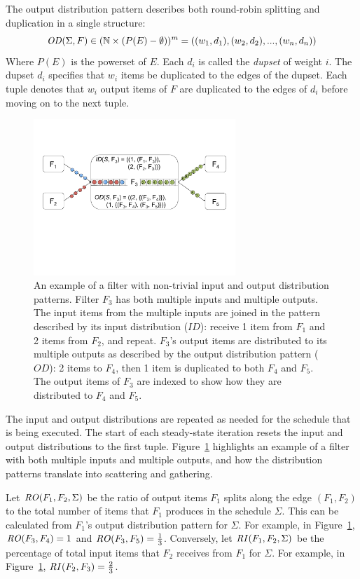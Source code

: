 The output distribution pattern describes both round-robin
splitting and duplication in a single structure:
{\ninepoint
\[ \relax{\it OD}(\Sigma, F) \in (\mathbb{N} \times (P(E)-\emptyset))^m = ((w_1,d_1), (w_2,
d_2), ..., (w_n, d_n))\]
}
\noindent Where $P(E)$ is the powerset of $E$.  Each $d_i$ is called
the {\it dupset} of weight $i$.  The dupset $d_i$ specifies that $w_i$
items be duplicated to the edges of the dupset.  Each tuple denotes
that $w_i$ output items of $F$ are duplicated to the edges of $d_i$
before moving on to the next tuple.

\begin{figure}[t]
\centering
\includegraphics[width=3in]{figures/dist-example.pdf}
\caption[Example of input and output distribution.]{
An example of a filter with non-trivial input and output distribution patterns.
Filter $F_3$ has both multiple inputs and multiple outputs.  The input
items from the multiple inputs are joined in the pattern described by
its input distribution ($ID$): receive 1 item from $F_1$ and 2
items from $F_2$, and repeat.  $F_3$'s output items are distributed to
its multiple outputs as described by the output distribution pattern
($OD$):  2 items to $F_4$, then 1 item is duplicated to both $F_4$ and
$F_5$.  The output items of $F_3$ are indexed to show how they are
distributed to $F_4$ and $F_5$.
\label{fig:dist-example}}
\vspace{-10pt}
\end{figure}

The input and output distributions are repeated as needed for the
schedule that is being executed.  The start of each steady-state
iteration resets the input and output distributions to the first tuple.
Figure~\ref{fig:dist-example} highlights an example of a filter with
both multiple inputs and multiple outputs, and how the distribution
patterns translate into scattering and gathering.

Let $\relax{\it RO}(F_1, F_2, \Sigma)$ be the ratio of output items $F_1$
splits along the edge $(F_1, F_2)$ to the total number of items that
$F_1$ produces in the schedule $\Sigma$.  This can be calculated from
$F_1$'s output distribution pattern for $\Sigma$.  For example, in
Figure~\ref{fig:dist-example}, $\relax{\it RO}(F_3, F_4) = 1$ and
$\relax{\it RO}(F_3, F_5) = \frac{1}{3}$.  Conversely, let $\relax{\it RI}(F_1, F_2,
\Sigma)$ be the percentage of total input items that $F_2$ receives
from $F_1$ for $\Sigma$.  For example, in
Figure~\ref{fig:dist-example}, $\relax{\it RI}(F_2,F_3) = \frac{2}{3}$.

